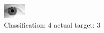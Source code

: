 \begin{figure}[h!]
\begin{center}
\includegraphics[width=0.60\columnwidth]{figures/ID2064_class_4_target_3.png}
\end{center}
\caption{ Classification: 4 actual target: 3}
\label{fig:ID2064_class_4_target_3}
\end{figure}
